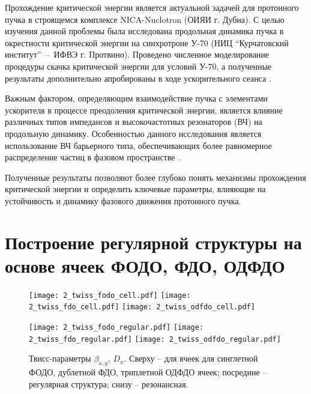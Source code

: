 \par Прохождение критической энергии является актуальной задачей для протонного пучка в строящемся комплексе NICA-Nuclotron (ОИЯИ г. Дубна). С целью изучения данной проблемы была исследована продольная динамика пучка в окрестности критической энергии на синхротроне У-70 (НИЦ “Курчатовский институт”~--~ИФВЭ г. Протвино). Проведено численное моделирование процедуры скачка критической энергии для условий У-70, а полученные результаты дополнительно апробированы в ходе ускорительного сеанса \cite{Kolokolchikov:2025_U70}.

\par Важным фактором, определяющим взаимодействие пучка с элементами ускорителя в процессе преодоления критической энергии, является влияние различных типов импедансов и высокочастотных резонаторов (ВЧ) на продольную динамику. Особенностью данного исследования является использование ВЧ барьерного типа, обеспечивающих более равномерное распределение частиц в фазовом пространстве \cite{hans:bb}.

\par Полученные результаты позволяют более глубоко понять механизмы прохождения критической энергии и определить ключевые параметры, влияющие на устойчивость и динамику фазового движения протонного пучка.

	\section{Построение регулярной структуры на основе ячеек ФОДО, ФДО, ОДФДО}\label{sec:transition_jump/FODO_FDO}



\begin{figure} [h!]

   \texttt{[image: 2\_twiss\_fodo\_cell.pdf]}
   \texttt{[image: 2\_twiss\_fdo\_cell.pdf]}
   \texttt{[image: 2\_twiss\_odfdo\_cell.pdf]}

   \texttt{[image: 2\_twiss\_fodo\_regular.pdf]}
   \texttt{[image: 2\_twiss\_fdo\_regular.pdf]}
   \texttt{[image: 2\_twiss\_odfdo\_regular.pdf]}

   \caption{Твисс-параметры $\beta_{x,y}$, $D_{x}$. Сверху -- для ячеек для синглетной ФОДО, дублетной ФДО, триплетной ОДФДО ячеек; посредине -- регулярная структура; снизу -- резонансная.}
   \label{fig:fodo_fdo_odfdo_regular}
\end{figure}

